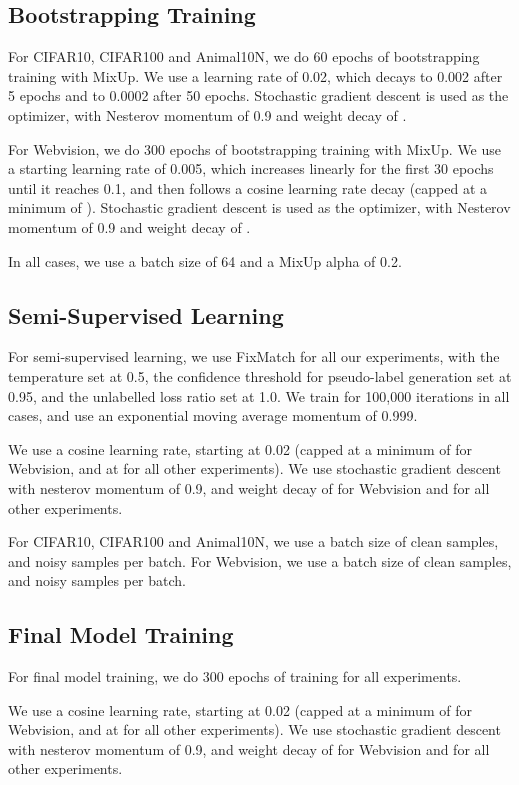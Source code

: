 \documentclass[10pt,twocolumn,letterpaper]{article}
\begin{document}
\subsection{Bootstrapping Training}

For CIFAR10, CIFAR100 and Animal10N, we do 60 epochs of bootstrapping training with MixUp. We use a learning rate of 0.02, which decays to 0.002 after 5 epochs and to 0.0002 after 50 epochs. Stochastic gradient descent is used as the optimizer, with Nesterov momentum of 0.9 and weight decay of .

For Webvision, we do 300 epochs of bootstrapping training with MixUp. We use a starting learning rate of 0.005, which increases linearly for the first 30 epochs until it reaches 0.1, and then follows a cosine learning rate decay (capped at a minimum of ). Stochastic gradient descent is used as the optimizer, with Nesterov momentum of 0.9 and weight decay of .

In all cases, we use a batch size of 64 and a MixUp alpha of 0.2.

\subsection{Semi-Supervised Learning}

For semi-supervised learning, we use FixMatch for all our experiments, with the temperature set at 0.5, the confidence threshold for pseudo-label generation set at 0.95, and the unlabelled loss ratio set at 1.0. We train for 100,000 iterations in all cases, and use an exponential moving average momentum of 0.999.

We use a cosine learning rate, starting at 0.02 (capped at a minimum of  for Webvision, and at  for all other experiments). We use stochastic gradient descent with nesterov momentum of 0.9, and weight decay of  for Webvision and  for all other experiments.

For CIFAR10, CIFAR100 and Animal10N, we use a batch size of  clean samples, and  noisy samples per batch. For Webvision, we use a batch size of  clean samples, and  noisy samples per batch.

\subsection{Final Model Training}

For final model training, we do 300 epochs of training for all experiments.

We use a cosine learning rate, starting at 0.02 (capped at a minimum of  for Webvision, and at  for all other experiments). We use stochastic gradient descent with nesterov momentum of 0.9, and weight decay of  for Webvision and  for all other experiments.
\end{document}
